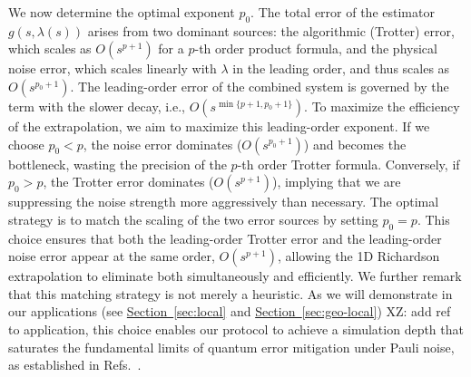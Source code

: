 \documentclass[11pt]{article}
\renewcommand{\sec}[1]{\hyperref[sec:#1]{Section~\ref*{sec:#1}}}
\newcommand{\xz}[1]{{\color{cyan} XZ: #1}}
\begin{document}
We now determine the optimal exponent $p_0$. The total error of the estimator $g(s, \lambda(s))$ arises from two dominant sources: the algorithmic (Trotter) error, which scales as $O(s^{p+1})$ for a $p$-th order product formula, and the physical noise error, which scales linearly with $\lambda$ in the leading order, and thus scales as $O(s^{p_0+1})$.
The leading-order error of the combined system is governed by the term with the slower decay, i.e., $O(s^{\min\{p+1, p_0+1\}})$. To maximize the efficiency of the extrapolation, we aim to maximize this leading-order exponent. If we choose $p_0 < p$, the noise error dominates ($O(s^{p_0+1})$) and becomes the bottleneck, wasting the precision of the $p$-th order Trotter formula. Conversely, if $p_0 > p$, the Trotter error dominates ($O(s^{p+1})$), implying that we are suppressing the noise strength more aggressively than necessary.
The optimal strategy is to match the scaling of the two error sources by setting $p_0 = p$. This choice ensures that both the leading-order Trotter error and the leading-order noise error appear at the same order, $O(s^{p+1})$, allowing the 1D Richardson extrapolation to eliminate both simultaneously and efficiently. We further remark that this matching strategy is not merely a heuristic. As we will demonstrate in our applications (see \sec{local} and \sec{geo-local}) \xz{add ref to application}, this choice enables our protocol to achieve a simulation depth that saturates the fundamental limits of quantum error mitigation under Pauli noise, as established in Refs.~\cite{wang2021noise, cai2021multi}.
\end{document}
